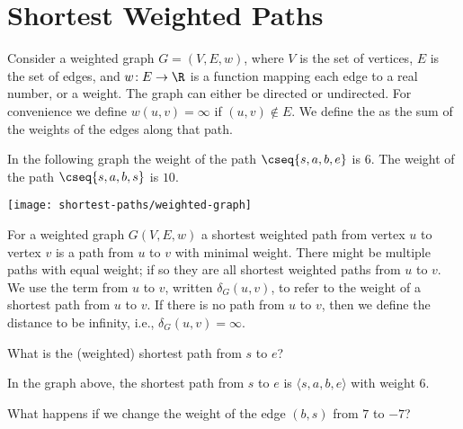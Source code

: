 \section{Shortest Weighted Paths}

Consider a weighted graph $G = (V, E, w)$, where $V$ is the set of
vertices, $E$ is the set of edges, and $w\!  : E \to \R$ is a function
mapping each edge to a real number, or a weight. 
%
The graph can either be directed or undirected.  For convenience we
define $w(u,v) = \infty$ if $(u,v) \not\in E$.  We define the
 as the sum of the weights of the edges along
that path.

\begin{example}
In the following graph the weight of the path $\cseq{s,a,b,e}$ is $6$.
The weight of the path $\cseq{s,a,b,s}$ is $10$.
\begin{center}
\texttt{[image: shortest-paths/weighted-graph]}
\end{center}
\label{ex:shortestpath::pathlength}
\end{example}

For a weighted graph $G(V,E,w)$ a shortest weighted path from vertex
$u$ to vertex $v$ is a path from $u$ to $v$ with minimal weight.
%
There might be multiple paths with equal weight; if so they are all
shortest weighted paths from $u$ to $v$.  
%
We use the term  from $u$ to $v$, written
$\delta_G(u,v)$, to refer to the weight of a shortest path from $u$ to
$v$.
%
If there is no path from $u$ to $v$, then we define the distance
to be infinity, i.e., $\delta_G(u,v) = \infty$.
%







\begin{question}
What is  the (weighted) shortest path from $s$ to $e$? 
\end{question}
\begin{answer}
In the graph above, the shortest path from $s$ to $e$ is $\langle
s,a,b,e \rangle$ with weight $6$.
\end{answer}


\begin{question}
What happens if we change the weight of the edge $(b,s)$ from $7$ to $-7$?
\end{question}

